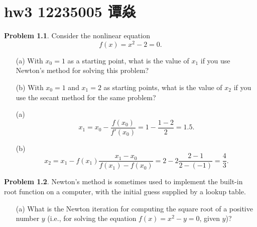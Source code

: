 \documentclass[a4paper]{book}
\makeatletter
\newenvironment{sol}[1][\solname]{\par
  \pushQED{\qed}
  \normalfont \topsep6\p@\@plus6\p@\relax
  \trivlist
  \item[\hskip\labelsep
        \itshape
    #1\@addpunct{.}]\ignorespaces
}{\popQED\endtrivlist\@endpefalse}
\providecommand{\solname}{Solution}
\numberwithin{equation}{chapter}
\theoremstyle{definition}
\newtheorem{pro}{Problem}
\makeatother
\begin{document}

\pagestyle{fancy}


\setcounter{chapter}{2}



\chapter{hw3 12235005 谭焱}
\begin{pro}
    Consider the nonlinear equation
    \begin{displaymath}
      f(x) = x^2 - 2 = 0.
    \end{displaymath}
    \begin{itemize}
    \item[(a)]
      With $x_0=1$ as a starting point,
      what is the value of $x_1$ if you use Newton's method for solving this problem?
  
    \item[(b)]
      With $x_0=1$ and $x_1=2$ as starting points,
      what is the value of $x_2$ if you use the secant method for the same problem?
    \end{itemize}
  \end{pro}
  
  \begin{sol}
    \begin{itemize}
    \item[(a)]
      \begin{displaymath}
        x_1 = x_0 - \frac{f(x_0)}{f'(x_0)} = 1 - \frac{1-2}{2} = 1.5.
      \end{displaymath}
  
    \item[(b)]
      \begin{displaymath}
        x_2 = x_1 - f(x_1)\frac{x_1-x_0}{f(x_1)-f(x_0)}
      = 2 - 2 \frac{2-1}{2-(-1)} = \frac{4}{3}.
      \end{displaymath}
    \end{itemize}
  \end{sol}

  \begin{pro}
    Newton's method is sometimes used to implement the built-in
    root function on a computer, with the initial guess
    supplied by a lookup table.
    \begin{itemize}
        \item [(a)] What is the Newton iteration for computing the square root of a
        positive number $y$ (i.e., for solving the equation
        $f(x)=x^2-y=0$, given $y$)?
    \end{itemize}
  \end{pro}
  
\end{document}
